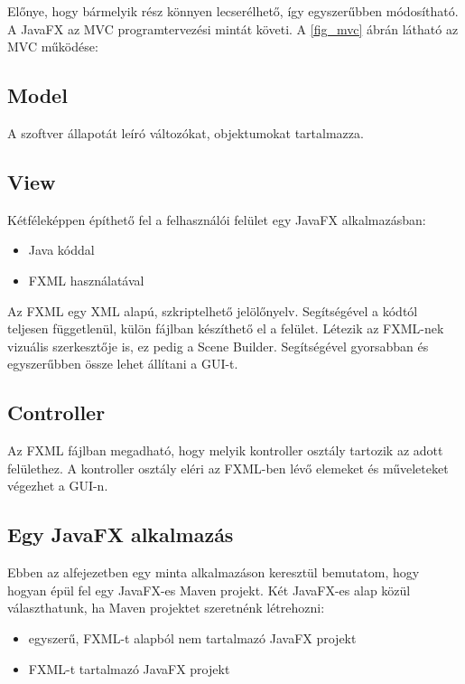 Előnye, hogy bármelyik rész könnyen lecserélhető, így egyszerűbben módosítható.
A JavaFX az MVC programtervezési mintát követi.
A \ref{fig_mvc} ábrán látható az MVC működése:



\subsection*{Model} 

A szoftver állapotát leíró változókat, objektumokat tartalmazza. 

\subsection*{View}

Kétféleképpen építhető fel a felhasználói felület egy JavaFX alkalmazásban: 

\begin{itemize}
\item Java kóddal 
\item FXML használatával 
\end{itemize}

Az FXML egy XML alapú, szkriptelhető jelölőnyelv.
Segítségével a kódtól teljesen függetlenül, külön fájlban készíthető el a felület.
Létezik az FXML-nek vizuális szerkesztője is, ez pedig a Scene Builder.
Segítségével gyorsabban és egyszerűbben össze lehet állítani a GUI-t. 

\subsection*{Controller}

Az FXML fájlban megadható, hogy melyik kontroller osztály tartozik az adott felülethez.
A kontroller osztály eléri az FXML-ben lévő elemeket és műveleteket végezhet a GUI-n.


\subsection{Egy JavaFX alkalmazás}

Ebben az alfejezetben egy minta alkalmazáson keresztül bemutatom, hogy hogyan épül fel egy JavaFX-es Maven projekt.
Két JavaFX-es alap közül választhatunk, ha Maven projektet szeretnénk létrehozni: 

\begin{itemize}
\item egyszerű, FXML-t alapból nem tartalmazó JavaFX projekt 
\item FXML-t tartalmazó JavaFX projekt 
\end{itemize}

